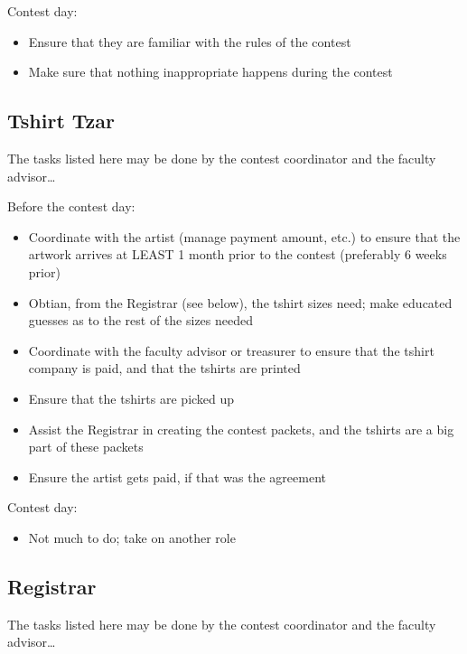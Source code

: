 \documentclass[11pt,twoside,letterpaper]{book}
\newenvironment{itemlist}{
\begin{itemize}
\setlength{\itemsep}{0pt}
\setlength{\parskip}{0pt}}
{\end{itemize}}
\begin{document}
\noindent Contest day:

\begin{itemlist}
\item Ensure that they are familiar with the rules of the contest
\item Make sure that nothing inappropriate happens during the contest
\end{itemlist}


\subsection{Tshirt Tzar}

\noindent The tasks listed here may be done by the contest coordinator
and the faculty advisor\ldots

\noindent Before the contest day:

\begin{itemlist}
\item Coordinate with the artist (manage payment amount, etc.) to
  ensure that the artwork arrives at LEAST 1 month prior to the
  contest (preferably 6 weeks prior)
\item Obtian, from the Registrar (see below), the tshirt sizes need;
  make educated guesses as to the rest of the sizes needed
\item Coordinate with the faculty advisor or treasurer to ensure that
  the tshirt company is paid, and that the tshirts are printed
\item Ensure that the tshirts are picked up
\item Assist the Registrar in creating the contest packets, and the
  tshirts are a big part of these packets
\item Ensure the artist gets paid, if that was the agreement 
\end{itemlist}

\noindent Contest day:

\begin{itemlist}
\item Not much to do; take on another role
\end{itemlist}



\subsection{Registrar}

\noindent The tasks listed here may be done by the contest coordinator
and the faculty advisor\ldots
\end{document}
